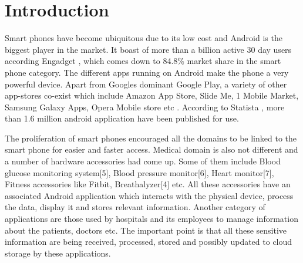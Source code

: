 \section{Introduction}
\label{intro}
Smart phones have become ubiquitous due to its low cost and Android is the biggest player in the market. It boast of more than a billion active 30 day users according Engadget \cite{Engadget_market_share}, which comes down to 84.8\% market share in the smart phone category. The different apps running on Android make the phone a very powerful device. Apart from Googles dominant Google Play, a variety of other app-stores co-exist which include Amazon App Store, Slide Me, 1 Mobile Market, Samsung Galaxy Apps, Opera Mobile store etc \cite{Online_App_Stores}. According to Statista \cite{Android_app_number}, more than 1.6 million android application have been published for use.

The proliferation of smart phones encouraged all the domains to be linked to the smart phone for easier and faster access. Medical domain is also not different and a number of hardware accessories had come up. Some of them include Blood glucose monitoring system[5], Blood pressure monitor[6], Heart monitor[7], Fitness accessories like Fitbit, Breathalyzer[4] etc. All these accessories have an associated Android application which interacts with the physical device, process the data, display it and stores relevant information. Another category of applications are those used by hospitals and its employees to manage information about the patients, doctors etc. The important point is that all these sensitive information are being received, processed, stored and possibly updated to cloud storage by these applications.

